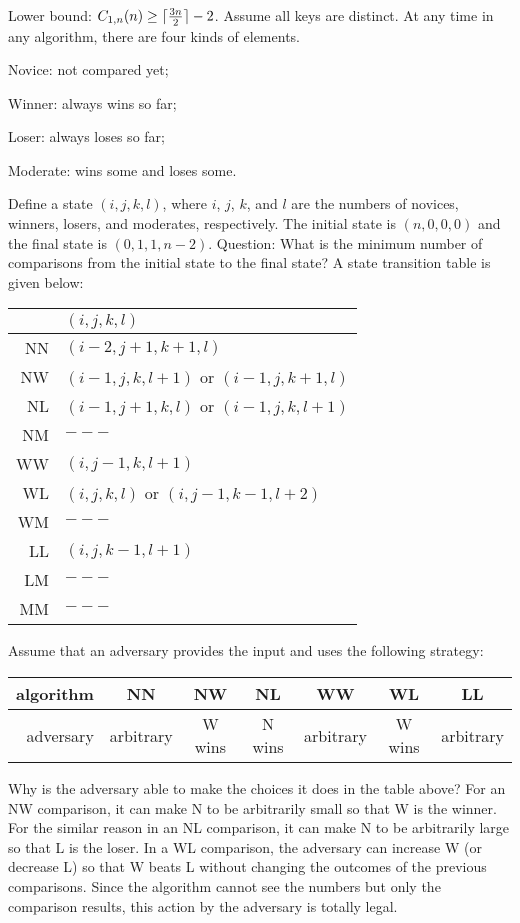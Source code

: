 \documentclass{article}
\begin{document}
\begin{itemize}
Lower bound: $C_{1,n}(n)\ge\lceil{3n\over2}\rceil-2$.
Assume all keys are distinct. At any time in any algorithm,
there are four kinds of elements.

Novice: not compared yet;

Winner: always wins so far;

Loser: always loses so far;

Moderate: wins some and loses some.

Define a state $(i,j,k,l)$, where $i$, $j$, $k$, and $l$ are
the numbers of novices, winners, losers, and moderates, respectively.
The initial state is $(n,0,0,0)$ and the final state is $(0,1,1,n-2)$.
Question: What is the minimum number of comparisons from the initial
state to the final state? A state transition table is given below:

\begin{center}
\begin{tabular}{r|l}
& $(i,j,k,l)$\\\hline
NN & $(i-2,j+1,k+1,l)$\\
NW & $(i-1,j,k,l+1)$ or $(i-1,j,k+1,l)$\\
NL & $(i-1,j+1,k,l)$ or $(i-1,j,k,l+1)$\\
NM & $---$\\
WW & $(i,j-1,k,l+1)$\\
WL & $(i,j,k,l)$ or $(i,j-1,k-1,l+2)$\\
WM & $---$\\
LL & $(i,j,k-1,l+1)$\\
LM & $---$\\
MM & $---$
\end{tabular}
\end{center}

Assume that an adversary provides the input and uses the following
strategy:

\begin{center}
\begin{tabular}{r|c|c|c|c|c|c}
algorithm & NN & NW & NL & WW & WL & LL \\\hline
adversary & arbitrary & W wins & N wins & arbitrary & W wins & arbitrary
\end{tabular}
\end{center}

Why is the adversary able to make the choices it does in the table
above? For an NW comparison, it can make N to be arbitrarily small 
so that W is the winner. For the similar reason in an NL comparison,
it can make N to be arbitrarily large so that L is the loser.
In a WL comparison, the adversary can increase W (or decrease L) so
that W beats L without changing the outcomes of the previous
comparisons. Since the algorithm cannot see the numbers but only
the comparison results, this action by the adversary is totally
legal. 


\end{itemize}
\end{document}
